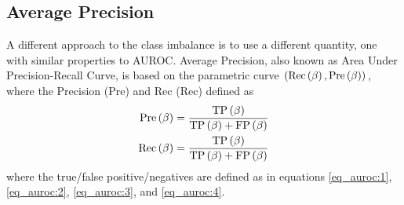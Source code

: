 \subsection{Average Precision}

A different approach to the class imbalance is to use a different quantity, one with similar properties to AUROC.
%
Average Precision, also known as Area Under Precision-Recall Curve, is based on the parametric curve 
$\left( \text{Rec}\left( \beta \right), \text{Pre}\left( \beta \right) \right)$, where the Precision (Pre) and Rec (Rec) defined as
\begin{align}
\text{Pre}\left( \beta \right)
&=
\frac{ \text{TP}\left( \beta \right) }{\text{TP}\left( \beta \right) + \text{FP}\left( \beta \right)}
\\
\text{Rec}\left( \beta \right)
&=
\frac{ \text{TP}\left( \beta \right) }{\text{TP}\left( \beta \right) + \text{FP}\left( \beta \right)}
\end{align}
where the true/false positive/negatives are defined as in equations 
\ref{eq_auroc:1},
\ref{eq_auroc:2},
\ref{eq_auroc:3}, and
\ref{eq_auroc:4}.

